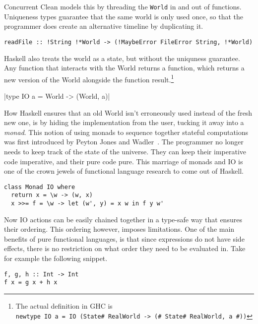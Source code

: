 \documentclass{report}
\begin{document}
Concurrent Clean models this by threading the \texttt{World} in and out of
functions. Uniqueness types guarantee that the same world is only used once, so
that the programmer does create an alternative timeline by duplicating it.

\begin{verbatim}
readFile :: !String !*World -> (!MaybeError FileError String, !*World)
\end{verbatim}

Haskell also treats the world as a state, but without the uniquness guarantee.
Any function that interacts with the World returns a function, which returns a
new version of the World alongside the function result.\footnote{The actual
  definition in GHC is \\ \texttt{newtype IO a = IO (State#
    RealWorld -> (# State# RealWorld, a #))}}

|type IO a = World -> (World, a)|

How Haskell ensures that an old World isn't erroneously used instead of the
fresh new one, is by hiding the implementation from the user, tucking it away
into a \textit{monad}. This notion of using monads to sequence together stateful
computations was first introduced by Peyton Jones and
Wadler~\cite{peytonjones1993}\cite{wadler1995}. The programmer no longer needs
to keep track of the state of the universe. They can keep their imperative code imperative,
and their pure code pure. This marriage of monads and IO is one of the crown
jewels of functional language research to come out of Haskell.
\begin{verbatim}
class Monad IO where
  return x = \w -> (w, x)
  x >>= f = \w -> let (w', y) = x w in f y w'
\end{verbatim}

Now IO actions can be easily chained together in a type-safe way that ensures
their ordering.
This ordering however, imposes limitations. One of the main benefits of pure
functional languages, is that since expressions do not have side effects, there
is no restriction on what order they need to be evaluated in.
Take for example the following snippet.
\begin{verbatim}
f, g, h :: Int -> Int
f x = g x + h x
\end{verbatim}
\end{document}
